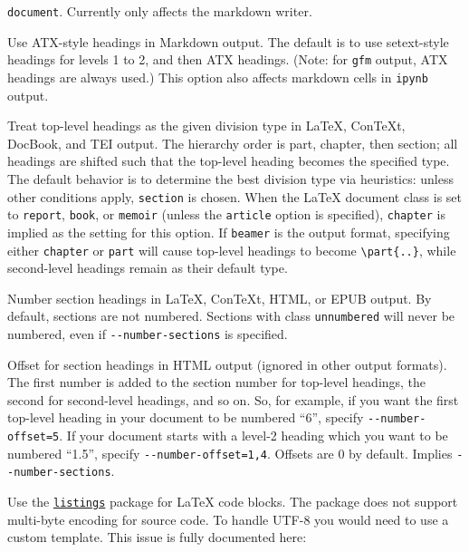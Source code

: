 \documentclass[
  12pt,
  a4paper,
]{article}
\begin{document}
\begin{description}
\texttt{document}. Currently only affects the markdown writer.
\item[\texttt{-\/-atx-headers}]
Use ATX-style headings in Markdown output. The default is to use setext-style headings for levels
1 to 2, and then ATX headings. (Note: for \texttt{gfm} output, ATX headings are always used.) This
option also affects markdown cells in \texttt{ipynb} output.
\item[\texttt{-\/-top-level-division={[}default\textbar{}section\textbar{}chapter\textbar{}part{]}}]
Treat top-level headings as the given division type in LaTeX, ConTeXt, DocBook, and TEI output.
The hierarchy order is part, chapter, then section; all headings are shifted such that the
top-level heading becomes the specified type. The default behavior is to determine the best
division type via heuristics: unless other conditions apply, \texttt{section} is chosen. When the
LaTeX document class is set to \texttt{report}, \texttt{book}, or \texttt{memoir} (unless the
\texttt{article} option is specified), \texttt{chapter} is implied as the setting for this option.
If \texttt{beamer} is the output format, specifying either \texttt{chapter} or \texttt{part} will
cause top-level headings to become \texttt{\textbackslash{}part\{..\}}, while second-level
headings remain as their default type.
\item[\texttt{-N}, \texttt{-\/-number-sections}]
Number section headings in LaTeX, ConTeXt, HTML, or EPUB output. By default, sections are not
numbered. Sections with class \texttt{unnumbered} will never be numbered, even if
\texttt{-\/-number-sections} is specified.
\item[\texttt{-\/-number-offset=}\emph{NUMBER}{[}\texttt{,}\emph{NUMBER}\texttt{,}\emph{\ldots{}}{]}]
Offset for section headings in HTML output (ignored in other output formats). The first number is
added to the section number for top-level headings, the second for second-level headings, and so
on. So, for example, if you want the first top-level heading in your document to be numbered
``6'', specify \texttt{-\/-number-offset=5}. If your document starts with a level-2 heading which
you want to be numbered ``1.5'', specify \texttt{-\/-number-offset=1,4}. Offsets are 0 by default.
Implies \texttt{-\/-number-sections}.
\item[\texttt{-\/-listings}]
Use the \href{https://ctan.org/pkg/listings}{\texttt{listings}} package for LaTeX code blocks. The
package does not support multi-byte encoding for source code. To handle UTF-8 you would need to
use a custom template. This issue is fully documented here:

\end{description}
\end{document}
